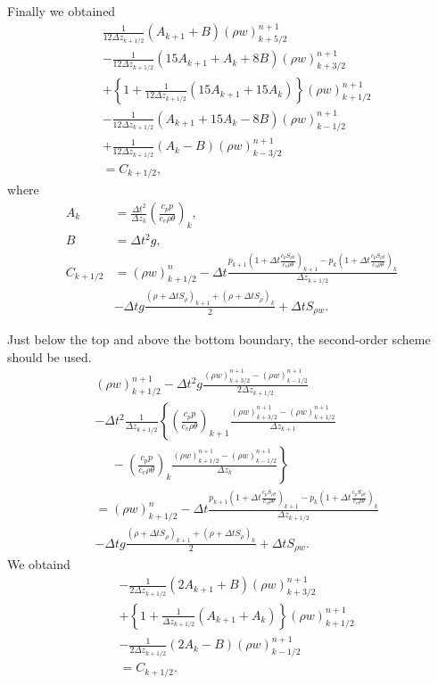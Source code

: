 Finally we obtained
\begin{align}
  & \frac{1}{12\Delta z_{k+1/2}}(A_{k+1} + B) (\rho w)_{k+5/2}^{n+1} \\
  &- \frac{1}{12\Delta z_{k+1/2}}(15A_{k+1} + A_k + 8B) (\rho w)_{k+3/2}^{n+1} \\
  &+ \left\{ 1 + \frac{1}{12\Delta z_{k+1/2}}(15A_{k+1} + 15A_k)  \right\}(\rho w)_{k+1/2}^{n+1} \\
  &- \frac{1}{12\Delta z_{k+1/2}}(A_{k+1} + 15A_k -8B) (\rho w)_{k-1/2}^{n+1} \\
  &+ \frac{1}{12\Delta z_{k+1/2}}(A_k - B) (\rho w)_{k-3/2}^{n+1} \\
  &= C_{k+1/2},
\end{align}
where
\begin{align}
  A_k &= \frac{\Delta t^2}{\Delta z_k}\left(\frac{c_pp}{c_v\rho\theta}\right)_k, \\
  B &= \Delta t^2 g, \\
  C_{k+1/2} &=
  (\rho w)_{k+1/2}^n
  -\Delta t\frac{
  p_{k+1}\left(1+\Delta t\frac{c_pS_{\rho\theta}}{c_v\rho\theta}\right)_{k+1}
  - p_k\left(1+\Delta t\frac{c_pS_{\rho\theta}}{c_v\rho\theta}\right)_k}{\Delta z_{k+1/2}} \nonumber\\ &
  -\Delta t g \frac{(\rho+\Delta t S_\rho)_{k+1}+(\rho+\Delta t S_\rho)_k}{2} + \Delta t S_{\rho w}.
\end{align}

Just below the top and above the bottom boundary, the second-order scheme should be used.
\begin{align}
&
  (\rho w)_{k+1/2}^{n+1}
  -\Delta t^2 g\frac{(\rho w)_{k+3/2}^{n+1}-(\rho w)_{k-1/2}^{n+1}}{2\Delta z_{k+1/2}}  \nonumber\\ &
  -\Delta t^2 \frac{1}{\Delta z_{k+1/2}}\left\{
  \left(\frac{c_pp}{c_v\rho\theta}\right)_{k+1}\frac{(\rho w)_{k+3/2}^{n+1}-(\rho w)_{k+1/2}^{n+1}}{\Delta z_{k+1}}
  \right. \nonumber\\ & \left.\:\:\:\:\:\:
  -\left(\frac{c_pp}{c_v\rho\theta}\right)_k\frac{(\rho w)_{k+1/2}^{n+1}-(\rho w)_{k-1/2}^{n+1}}{\Delta z_k} \right\} \nonumber\\
  &=
  (\rho w)_{k+1/2}^n -\Delta t\frac{
  p_{k+1}\left(1+\Delta t\frac{c_pS_{\rho\theta}}{c_v\rho\theta}\right)_{k+1}
  - p_k\left(1+\Delta t\frac{c_pS_{\rho\theta}}{c_v\rho\theta}\right)_k}{\Delta z_{k+1/2}} \nonumber\\ &
  -\Delta t g \frac{(\rho+\Delta t S_\rho)_{k+1}+(\rho+\Delta t S_\rho)_k}{2} + \Delta t S_{\rho w}.
\end{align}
We obtaind
\begin{align}
  &- \frac{1}{2\Delta z_{k+1/2}}(2A_{k+1} + B) (\rho w)_{k+3/2}^{n+1} \\
  &+ \left\{ 1 + \frac{1}{\Delta z_{k+1/2}}(A_{k+1} + A_k)  \right\}(\rho w)_{k+1/2}^{n+1} \\
  &- \frac{1}{2\Delta z_{k+1/2}}(2A_k -B) (\rho w)_{k-1/2}^{n+1} \\
  &= C_{k+1/2}.
\end{align}





